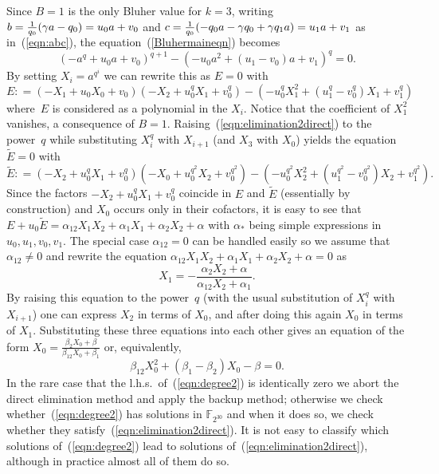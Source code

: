\documentclass[11pt]{llncs}
\newcommand{\F}{\mathbb F}
\newcommand{\defeq}{\mathrel{\mathop:}=}
\begin{document}
Since $B = 1$ is the only Bluher value for $k = 3$, writing $b = \smash{\frac 1 {q_0}} (\gamma a - q_0) = u_0 a + v_0$ and 
$c = \smash{\frac 1 {q_0}} (-q_0 a - \gamma q_0 + \gamma q_1 a) = u_1 a + v_1$ as in~(\ref{eqn:abc}), the equation~(\ref{Bluhermaineqn}) becomes
\begin{equation}\label{eqn:elimination2direct}
(-a^q +u_0a+v_0)^{q+1}-(-u_0 a^2 + (u_1-v_0)a + v_1)^q=0.
\end{equation}
By setting $X_i=a^{q^i}$ we can rewrite this as $E=0$ with
\[ E \defeq (-X_1+u_0X_0+v_0)(-X_2+u_0^qX_1+v_0^q)
  - (-u_0^qX_1^2+(u_1^q-v_0^q)X_1+v_1^q) \]
where~$E$ is considered as a polynomial in the $X_i$.
Notice that the coefficient of $X_1^2$ vanishes, a consequence of $B=1$.
Raising~(\ref{eqn:elimination2direct}) to the power~$q$ while
substituting $X_i^q$ with $X_{i+1}$ (and $X_3$ with $X_0$)
yields the equation $\tilde E= 0 $ with
\[ \tilde E \defeq (-X_2+u_0^qX_1+v_0^q)(-X_0+u_0^{q^2}X_2+v_0^{q^2})
  - (-u_0^{q^2}X_2^2+(u_1^{q^2}-v_0^{q^2})X_2+v_1^{q^2}). \]
Since the factors $-X_2+u_0^qX_1+v_0^q$ coincide in $E$ and $\tilde E$
(essentially by construction) and $X_0$ occurs only in their cofactors, it
is easy to see that $E + u_0 \tilde E = \alpha_{12} X_1 X_2 + \alpha_1 X_1
+ \alpha_2 X_2 + \alpha$ with $\alpha_{*}$ being simple expressions in
$u_0, u_1, v_0, v_1$.  The special case $\alpha_{12} = 0$ can be handled
easily so we assume that $\alpha_{12} \ne 0$ and rewrite the equation
$\alpha_{12} X_1 X_2 + \alpha_1 X_1 + \alpha_2 X_2 + \alpha = 0$ as
\[ X_1 = -\frac {\alpha_2 X_2 + \alpha} {\alpha_{12} X_2 + \alpha_1} . \]
By raising this equation to the power~$q$ (with the usual substitution
of $X_i^q$ with $X_{i+1}$) one can express $X_2$ in terms of $X_0$,
and after doing this again $X_0$ in terms of $X_1$.  Substituting these
three equations into each other gives an equation of the form $X_0 =
\frac {\beta_2 X_0 + \beta} {\beta_{12} X_0 + \beta_1}$ or, equivalently,
\begin{equation}\label{eqn:degree2}
\beta_{12}X_0^2+(\beta_1-\beta_2)X_0-\beta=0.
\end{equation}
In the rare case that the l.h.s.\ of~(\ref{eqn:degree2}) is identically zero 
we abort the direct elimination method and apply the backup method; otherwise we check whether~(\ref{eqn:degree2}) has solutions in $\F_{2^{30}}$ and when it does so, we check whether they satisfy~(\ref{eqn:elimination2direct}). It is not easy to classify which solutions of~(\ref{eqn:degree2}) 
lead to solutions of~(\ref{eqn:elimination2direct}), although in practice almost all of them do so.
\end{document}
